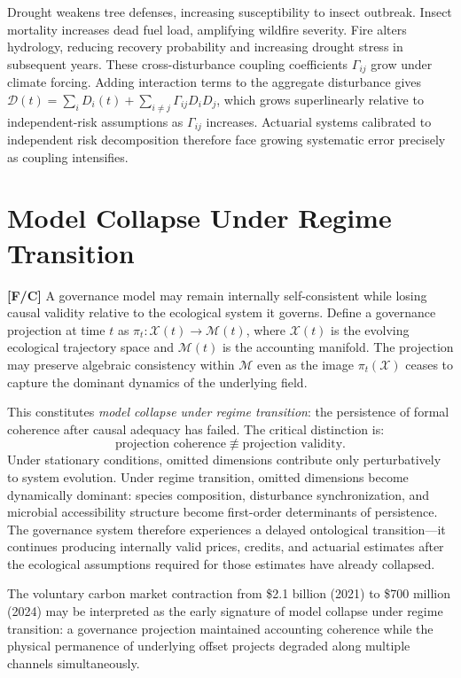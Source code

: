 \documentclass[12pt]{article}
\begin{document}
Drought weakens tree defenses, increasing susceptibility to insect outbreak. Insect
mortality increases dead fuel load, amplifying wildfire severity. Fire alters hydrology,
reducing recovery probability and increasing drought stress in subsequent years. These
cross-disturbance coupling coefficients $\Gamma_{ij}$ grow under climate forcing.
Adding interaction terms to the aggregate disturbance gives
$\mathcal{D}(t) = \sum_i D_i(t) + \sum_{i\neq j} \Gamma_{ij} D_i D_j$,
which grows superlinearly relative to independent-risk assumptions as $\Gamma_{ij}$
increases. Actuarial systems calibrated to independent risk decomposition therefore
face growing systematic error precisely as coupling intensifies.

\section{Model Collapse Under Regime Transition}

\textbf{[F/C]} A governance model may remain internally self-consistent while losing
causal validity relative to the ecological system it governs. Define a governance
projection at time $t$ as $\pi_t:\mathcal{X}(t)\to\mathcal{M}(t)$, where $\mathcal{X}(t)$
is the evolving ecological trajectory space and $\mathcal{M}(t)$ is the accounting manifold.
The projection may preserve algebraic consistency within $\mathcal{M}$ even as the image
$\pi_t(\mathcal{X})$ ceases to capture the dominant dynamics of the underlying field.

This constitutes \emph{model collapse under regime transition}: the persistence of formal
coherence after causal adequacy has failed. The critical distinction is:
\begin{equation}
\text{projection coherence} \not\equiv \text{projection validity}.
\end{equation}
Under stationary conditions, omitted dimensions contribute only perturbatively to system
evolution. Under regime transition, omitted dimensions become dynamically dominant:
species composition, disturbance synchronization, and microbial accessibility structure
become first-order determinants of persistence. The governance system therefore
experiences a delayed ontological transition---it continues producing internally valid
prices, credits, and actuarial estimates after the ecological assumptions required for
those estimates have already collapsed.

The voluntary carbon market contraction from \$2.1 billion (2021) to \$700 million
(2024) may be interpreted as the early signature of model collapse under regime
transition: a governance projection maintained accounting coherence while the physical
permanence of underlying offset projects degraded along multiple channels simultaneously.
\end{document}
